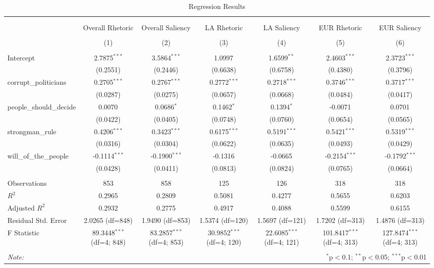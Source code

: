 \begin{table}[!htbp] \centering
  \caption{Regression Results}
\begin{tabular}{@{\extracolsep{5pt}}lcccccc}
\\[-1.8ex]\hline
\hline \\[-1.8ex]
\\[-1.8ex] & \multicolumn{1}{c}{Overall Rhetoric} & \multicolumn{1}{c}{Overall Saliency} & \multicolumn{1}{c}{LA Rhetoric} & \multicolumn{1}{c}{LA Saliency} & \multicolumn{1}{c}{EUR Rhetoric} & \multicolumn{1}{c}{EUR Saliency}  \\
\\[-1.8ex] & (1) & (2) & (3) & (4) & (5) & (6) \\
\hline \\[-1.8ex]
 Intercept & 2.7875$^{***}$ & 3.5864$^{***}$ & 1.0997$^{}$ & 1.6599$^{**}$ & 2.4603$^{***}$ & 2.3723$^{***}$ \\
& (0.2551) & (0.2446) & (0.6638) & (0.6758) & (0.4380) & (0.3796) \\
 corrupt_politicians & 0.2705$^{***}$ & 0.2767$^{***}$ & 0.2772$^{***}$ & 0.2718$^{***}$ & 0.3746$^{***}$ & 0.3717$^{***}$ \\
& (0.0287) & (0.0275) & (0.0657) & (0.0668) & (0.0484) & (0.0417) \\
 people_should_decide & 0.0070$^{}$ & 0.0686$^{*}$ & 0.1462$^{*}$ & 0.1394$^{*}$ & -0.0071$^{}$ & 0.0701$^{}$ \\
& (0.0422) & (0.0405) & (0.0748) & (0.0760) & (0.0654) & (0.0565) \\
 strongman_rule & 0.4206$^{***}$ & 0.3423$^{***}$ & 0.6175$^{***}$ & 0.5191$^{***}$ & 0.5421$^{***}$ & 0.5319$^{***}$ \\
& (0.0316) & (0.0304) & (0.0622) & (0.0635) & (0.0493) & (0.0429) \\
 will_of_the_people & -0.1114$^{***}$ & -0.1900$^{***}$ & -0.1316$^{}$ & -0.0665$^{}$ & -0.2154$^{***}$ & -0.1792$^{***}$ \\
& (0.0428) & (0.0411) & (0.0813) & (0.0824) & (0.0765) & (0.0664) \\
\hline \\[-1.8ex]
 Observations & 853 & 858 & 125 & 126 & 318 & 318 \\
 $R^2$ & 0.2965 & 0.2809 & 0.5081 & 0.4277 & 0.5655 & 0.6203 \\
 Adjusted $R^2$ & 0.2932 & 0.2775 & 0.4917 & 0.4088 & 0.5599 & 0.6155 \\
 Residual Std. Error & 2.0265 (df=848) & 1.9490 (df=853) & 1.5374 (df=120) & 1.5697 (df=121) & 1.7202 (df=313) & 1.4876 (df=313) \\
 F Statistic & 89.3448$^{***}$ (df=4; 848) & 83.2857$^{***}$ (df=4; 853) & 30.9852$^{***}$ (df=4; 120) & 22.6085$^{***}$ (df=4; 121) & 101.8417$^{***}$ (df=4; 313) & 127.8474$^{***}$ (df=4; 313) \\
\hline
\hline \\[-1.8ex]
\textit{Note:} & \multicolumn{6}{r}{$^{*}$p$<$0.1; $^{**}$p$<$0.05; $^{***}$p$<$0.01} \\
\end{tabular}
\end{table}